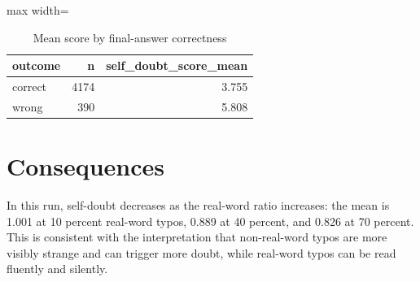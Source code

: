 \documentclass[11pt]{article}
\begin{document}
\begin{table}[H]
\centering
\caption{Mean score by final-answer correctness}
\small
\begin{adjustbox}{max width=\textwidth}
\begin{tabular}{lrr}
\toprule
\textbf{outcome} & \textbf{n} & \textbf{self\_doubt\_score\_mean} \\
\midrule
correct & 4174 & 3.755 \\
wrong & 390 & 5.808 \\
\bottomrule
\end{tabular}
\end{adjustbox}
\end{table}

\section*{Consequences} In this run, self-doubt decreases as the real-word ratio increases: the mean is 1.001 at 10 percent real-word typos, 0.889 at 40 percent, and 0.826 at 70 percent. This is consistent with the interpretation that non-real-word typos are more visibly strange and can trigger more doubt, while real-word typos can be read fluently and silently.
\end{document}
